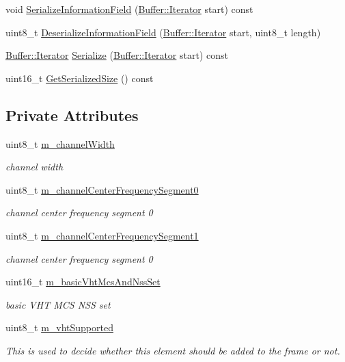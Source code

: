 \begin{DoxyCompactItemize}
\item 
void \hyperlink{classns3_1_1VhtOperation_a7e9f6a7be5da2ce7d61ebb142bc1a231}{Serialize\+Information\+Field} (\hyperlink{classns3_1_1Buffer_1_1Iterator}{Buffer\+::\+Iterator} start) const 
\item 
uint8\+\_\+t \hyperlink{classns3_1_1VhtOperation_aa6a5f566200f104335732b5070440efb}{Deserialize\+Information\+Field} (\hyperlink{classns3_1_1Buffer_1_1Iterator}{Buffer\+::\+Iterator} start, uint8\+\_\+t length)
\item 
\hyperlink{classns3_1_1Buffer_1_1Iterator}{Buffer\+::\+Iterator} \hyperlink{classns3_1_1VhtOperation_a6096b557edc33a9056a40bb4e2be8b48}{Serialize} (\hyperlink{classns3_1_1Buffer_1_1Iterator}{Buffer\+::\+Iterator} start) const 
\item 
uint16\+\_\+t \hyperlink{classns3_1_1VhtOperation_ae9624355a9f0ffff3bcc8baa5f5ce982}{Get\+Serialized\+Size} () const 
\end{DoxyCompactItemize}
\subsection*{Private Attributes}
\begin{DoxyCompactItemize}
\item 
uint8\+\_\+t \hyperlink{classns3_1_1VhtOperation_a0b17991d4eb9a85892904dcd63488d50}{m\+\_\+channel\+Width}
\begin{DoxyCompactList}\small\item\em channel width \end{DoxyCompactList}\item 
uint8\+\_\+t \hyperlink{classns3_1_1VhtOperation_a998cfd8033b2173fb92c6034e58ff1c7}{m\+\_\+channel\+Center\+Frequency\+Segment0}
\begin{DoxyCompactList}\small\item\em channel center frequency segment 0 \end{DoxyCompactList}\item 
uint8\+\_\+t \hyperlink{classns3_1_1VhtOperation_a6c064c69fcaeb3a704444df6c0aa08d4}{m\+\_\+channel\+Center\+Frequency\+Segment1}
\begin{DoxyCompactList}\small\item\em channel center frequency segment 0 \end{DoxyCompactList}\item 
uint16\+\_\+t \hyperlink{classns3_1_1VhtOperation_a072b5f5db82f78646807b3785dcc400f}{m\+\_\+basic\+Vht\+Mcs\+And\+Nss\+Set}
\begin{DoxyCompactList}\small\item\em basic V\+HT M\+CS N\+SS set \end{DoxyCompactList}\item 
uint8\+\_\+t \hyperlink{classns3_1_1VhtOperation_ac3202e017f07e6e3f00d1796c88f9105}{m\+\_\+vht\+Supported}
\begin{DoxyCompactList}\small\item\em This is used to decide whether this element should be added to the frame or not. \end{DoxyCompactList}\end{DoxyCompactItemize}
